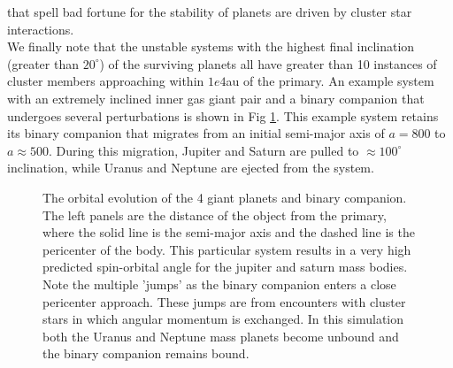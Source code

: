 \documentclass[manuscript]{aastex631}
\begin{document}
that spell bad fortune for the stability of planets are driven by cluster star interactions. \\
\indent We finally note that the unstable systems with the highest final inclination (greater than $20^{\circ}$) of the surviving planets
all have greater than 10 instances of cluster members approaching within $1e4$au of the primary. An example system with an extremely inclined
inner gas giant pair and a binary companion that undergoes several perturbations is shown in Fig \ref{fig:stepbinary}. This example system retains its binary companion that
migrates from an initial semi-major axis of $a=800$ to $a\approx 500$.
During this migration, Jupiter and Saturn are pulled to $\approx 100^{\circ}$ inclination, while Uranus and Neptune are ejected from the system.

\begin{figure}
    \caption{The orbital evolution of the 4 giant planets and binary companion. The left panels are the distance of the object from the primary,
    where the solid line is the semi-major axis and the dashed line is the pericenter of the body. This particular system results in a very high
    predicted spin-orbital angle for the jupiter and saturn mass bodies. Note the multiple 'jumps' as the binary companion 
    enters a close pericenter approach. These jumps are from encounters with cluster stars in which angular momentum is exchanged. In this
    simulation both the Uranus and Neptune mass planets become unbound and the binary companion remains bound.}
    \label{fig:stepbinary}
\end{figure}
\end{document}
